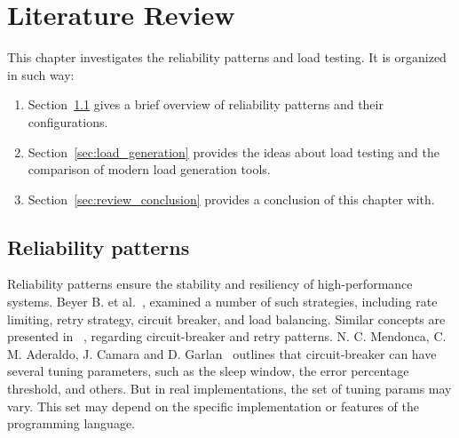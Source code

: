 \chapter{Literature Review}
\label{ch:lr}

This chapter investigates the reliability patterns and load testing.
It is organized in such way:
\begin{enumerate}
    \item Section~\ref{sec:reliability} gives a brief overview of reliability patterns and their configurations.
    \item Section~\ref{sec:load_generation} provides the ideas about load testing and the comparison of modern load generation tools.
    \item Section~\ref{sec:review_conclusion} provides a conclusion of this chapter with.
\end{enumerate}


\section{Reliability patterns}\label{sec:reliability}
Reliability patterns ensure the stability and resiliency of high-performance systems.
Beyer B. et al.~\cite{google_sre}, examined a number of such strategies, including rate limiting, retry strategy, circuit breaker, and load balancing. Similar concepts are presented in ~\cite{reliability_patterns}, regarding circuit-breaker and retry patterns.
N. C. Mendonca, C. M. Aderaldo, J. Camara and D. Garlan~\cite{circuit_breaker} outlines that circuit-breaker can have several tuning parameters, such as the sleep window, the error percentage threshold, and others. But in real implementations, the set of tuning params may vary. This set may depend on the specific implementation or features of the programming language.

